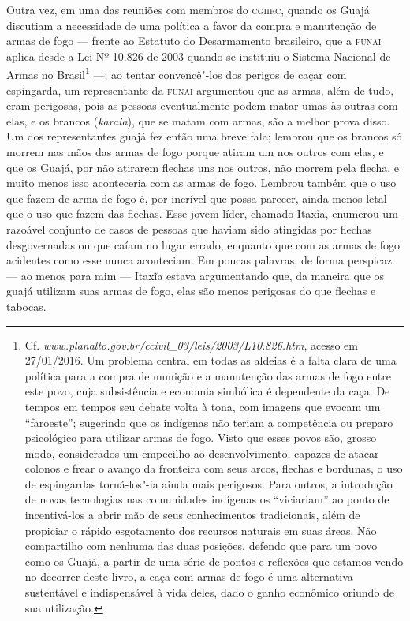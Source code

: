 Outra vez, em uma das reuniões com membros do \textsc{cgiirc}, quando os Guajá
discutiam a necessidade de uma política a favor da compra e manutenção
de armas de fogo --- frente ao Estatuto do Desarmamento brasileiro, que a
\textsc{funai} aplica desde a Lei Nº 10.826 de 2003 quando se instituiu o Sistema
Nacional de Armas no Brasil\footnote{Cf. \emph{www.planalto.gov.br/ccivil\_03/leis/2003/L10.826.htm},
  acesso em 27/01/2016. Um problema central em todas as aldeias é a
  falta clara de uma política para a compra de munição e a manutenção
  das armas de fogo entre este povo, cuja subsistência e economia
  simbólica é dependente da caça. De tempos em tempos seu debate volta à
  tona, com imagens que evocam um ``faroeste''; sugerindo que os
  indígenas não teriam a competência ou preparo psicológico para
  utilizar armas de fogo. Visto que esses povos são, grosso modo,
  considerados um empecilho ao desenvolvimento, capazes de atacar
  colonos e frear o avanço da fronteira com seus arcos, flechas e
  bordunas, o uso de espingardas torná-los"-ia ainda mais perigosos. Para
  outros, a introdução de novas tecnologias nas comunidades indígenas os
  ``viciariam'' ao ponto de incentivá-los a abrir mão de seus
  conhecimentos tradicionais, além de propiciar o rápido esgotamento dos
  recursos naturais em suas áreas. Não compartilho com nenhuma das duas
  posições, defendo que para um povo como os Guajá, a partir de uma
  série de pontos e reflexões que estamos vendo no decorrer deste livro,
  a caça com armas de fogo é uma alternativa sustentável e indispensável
  à vida deles, dado o ganho econômico oriundo de sua utilização.} ---; ao
tentar convencê"-los dos perigos de caçar com espingarda, um
representante da \textsc{funai} argumentou que as armas, além de tudo, eram
perigosas, pois as pessoas eventualmente podem matar umas às outras com
elas, e os brancos (\emph{karaia}), que se matam com armas, são a melhor
prova disso. Um dos representantes guajá fez então uma breve fala;
lembrou que os brancos só morrem nas mãos das armas de fogo porque
atiram um nos outros com elas, e que os Guajá, por não atirarem flechas
uns nos outros, não morrem pela flecha, e muito menos isso aconteceria
com as armas de fogo. Lembrou também que o uso que fazem de arma de fogo
é, por incrível que possa parecer, ainda menos letal que o uso que fazem
das flechas. Esse jovem líder, chamado Itaxĩa, enumerou um razoável
conjunto de casos de pessoas que haviam sido atingidas por flechas
desgovernadas ou que caíam no lugar errado, enquanto que com as armas de
fogo acidentes como esse nunca aconteciam. Em poucas palavras, de forma
perspicaz --- ao menos para mim --- Itaxĩa estava argumentando que, da
maneira que os guajá utilizam suas armas de fogo, elas são menos
perigosas do que flechas e tabocas.

